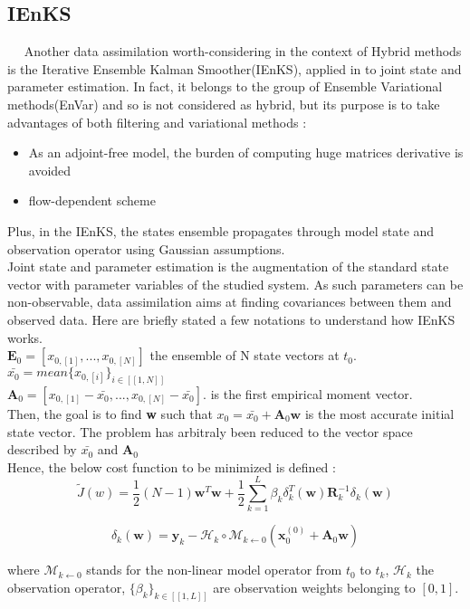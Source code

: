\documentclass[a4,12pt]{article}
\begin{document}
\subsection{IEnKS}
~~ Another data assimilation worth-considering in the context of Hybrid methods is the Iterative Ensemble Kalman Smoother(IEnKS), applied in \cite{jointState} to joint state and parameter estimation. In fact, it belongs to the group of Ensemble Variational methods(EnVar) and so is not considered as hybrid, but its purpose is to take advantages of both filtering and variational methods :
\begin{itemize}
\item As an adjoint-free model, the burden of computing huge matrices derivative is avoided
\item flow-dependent scheme
\end{itemize}
Plus, in the IEnKS, the states ensemble propagates through model state and observation operator using Gaussian assumptions. \\
Joint state and parameter estimation is the augmentation of the standard state vector with parameter variables of the studied system. As such parameters can be non-observable, data assimilation aims at finding covariances between them and observed data.
Here are briefly stated a few notations to understand how IEnKS works. \\
$\textbf{E}_0 = [x_{0,[1]},...,x_{0,[N]}]$ the ensemble of N state vectors at $t_0$. \\
$\bar{x_0} = mean\{x_{0,[i]}\}_{i \in [\![1,N]\!] }$ \\
$\textbf{A}_0 = [x_{0,[1]} - \bar{x_0},...,x_{0,[N]}- \bar{x_0}]$. is the first empirical moment vector.\\
Then, the goal is to find \textbf{w} such that $x_0 = \bar{x_0} + \textbf{A}_0 \textbf{w}$ is the most accurate initial state vector. The problem has arbitraly been reduced to the vector space described by $\bar{x_0}$ and $\textbf{A}_0$ \\
Hence, the below cost function to be minimized is defined : 
$$\tilde{J}(w) = \frac{1}{2}(N-1)\textbf{w}^{T}\textbf{w} + \frac{1}{2}\sum_{k=1}^{L}\beta_{k}\delta_{k}^{T}(\textbf{w})\textbf{R}_{k}^{-1}\delta_{k}(\textbf{w})$$

$$\delta_{k}(\textbf{w}) = \textbf{y}_{k} - \mathcal{H}_{k}\circ \mathcal{M}_{k\leftarrow 0}(\textbf{x}_{0}^{(0)} + \textbf{A}_{0}\textbf{w})$$

where $\mathcal{M}_{k\leftarrow 0}$ stands for the non-linear model operator from $t_{0}$ to $t_{k}$, $\mathcal{H}_{k}$ the observation operator, $\{\beta_k\}_{k \in [\![1,L]\!]}$ are observation weights belonging to $[0,1]$. 
\end{document}
